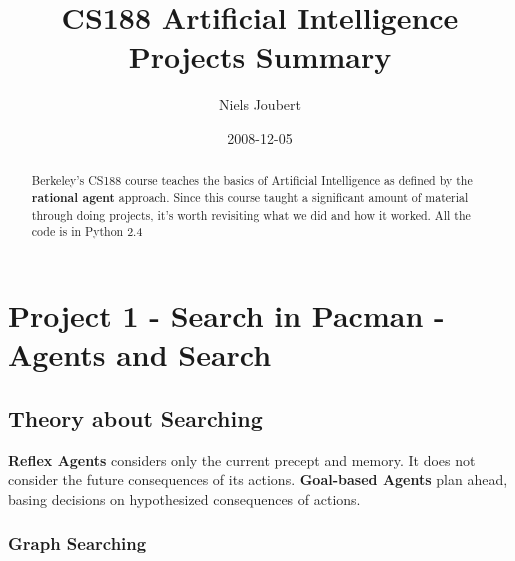 \documentclass[]{article}
\title{CS188 Artificial Intelligence Projects Summary}
\author{ Niels Joubert }
\date{2008-12-05}
\begin{document}
\ifpdf
{}
\else
{}
\fi

\maketitle

\begin{abstract}
Berkeley's CS188 course teaches the basics of Artificial Intelligence as defined by the \textbf{rational agent} approach. Since this course taught a significant amount of material through doing projects, it's worth revisiting what we did and how it worked. All the code is in Python 2.4
\end{abstract}

\tableofcontents

\pagebreak

\section{Project 1 - Search in Pacman - Agents and Search}\label{P1}

\subsection{Theory about Searching}

\textbf{Reflex Agents} considers only the current precept and memory. It does not consider the future consequences of its actions.
\textbf{Goal-based Agents} plan ahead, basing decisions on hypothesized consequences of actions.

\subsubsection{Graph Searching}
\end{document}

